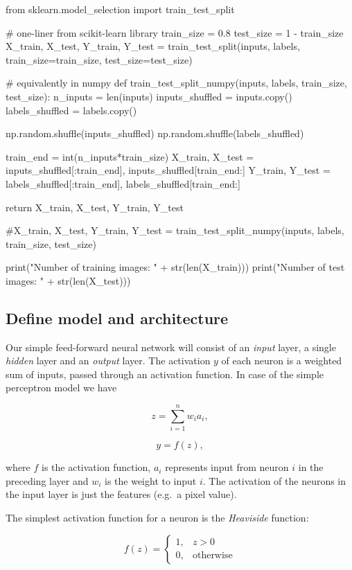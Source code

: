 \documentclass[%
oneside,                 %
final,                   %
10pt]{article}
\begin{document}
\bpycod
from sklearn.model_selection import train_test_split

# one-liner from scikit-learn library
train_size = 0.8
test_size = 1 - train_size
X_train, X_test, Y_train, Y_test = train_test_split(inputs, labels, train_size=train_size,
                                                    test_size=test_size)

# equivalently in numpy
def train_test_split_numpy(inputs, labels, train_size, test_size):
    n_inputs = len(inputs)
    inputs_shuffled = inputs.copy()
    labels_shuffled = labels.copy()
    
    np.random.shuffle(inputs_shuffled)
    np.random.shuffle(labels_shuffled)
    
    train_end = int(n_inputs*train_size)
    X_train, X_test = inputs_shuffled[:train_end], inputs_shuffled[train_end:]
    Y_train, Y_test = labels_shuffled[:train_end], labels_shuffled[train_end:]
    
    return X_train, X_test, Y_train, Y_test

#X_train, X_test, Y_train, Y_test = train_test_split_numpy(inputs, labels, train_size, test_size)

print("Number of training images: " + str(len(X_train)))
print("Number of test images: " + str(len(X_test)))

\epycod


\subsection{Define model and architecture}

Our simple feed-forward neural network will consist of an \emph{input} layer, a single \emph{hidden} layer and an \emph{output} layer. The activation $y$ of each neuron is a weighted sum of inputs, passed through an activation function. In case of the simple perceptron model we have 

$$ z = \sum_{i=1}^n w_i a_i ,$$

$$ y = f(z) ,$$

where $f$ is the activation function, $a_i$ represents input from neuron $i$ in the preceding layer
and $w_i$ is the weight to input $i$.  
The activation of the neurons in the input layer is just the features (e.g.~a pixel value).  

The simplest activation function for a neuron is the \emph{Heaviside} function:

$$ f(z) = 
\begin{cases}
1,  &  z > 0\\
0,  & \text{otherwise}
\end{cases}
$$
\end{document}
